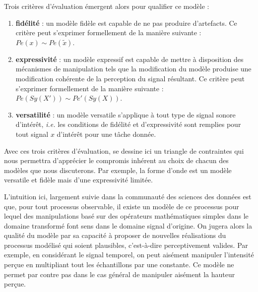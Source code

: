 Trois critères d'évaluation émergent alors pour qualifier ce modèle :
\begin{enumerate}
  \item \textbf{fidélité} : un modèle fidèle est capable de ne pas produire d'artefacts. Ce critère peut s'exprimer formellement de la manière suivante : $Pe(x) \sim Pe(\tilde{x})$.
  \item \textbf{expressivité} : un modèle expressif est capable de mettre à disposition des mécanismes de manipulation tels que la modification du modèle produise une modification cohérente de la perception du signal résultant. Ce critère peut s'exprimer formellement de la manière suivante : $Pe(Sy(X')) \sim Pe'(Sy(X))$.
  \item \textbf{versatilité} : un modèle versatile s'applique à tout type de signal sonore d'intérêt, \textit{i.e.} les conditions de fidélité et d'expressivité sont remplies pour tout signal $x$ d'intérêt pour une tâche donnée.
\end{enumerate}
Avec ces trois critères d'évaluation, se dessine ici un triangle de contraintes qui nous permettra d'apprécier le compromis inhérent au choix  de chacun des modèles que nous discuterons. Par exemple, la forme d'onde est un modèle versatile et fidèle mais d'une expressivité limitée.

L'intuition ici, largement suivie dans la communauté des sciences des données est que, pour tout processus observable, il existe un modèle de ce processus pour lequel des manipulations basé sur des opérateurs mathématiques simples dans le domaine transformé \og font sens \fg dans le domaine \fg signal \og d'origine. On jugera alors la qualité du modèle par sa capacité à proposer de nouvelles réalisations du processus modélisé qui soient plausibles, c'est-à-dire perceptivement valides. Par exemple, en considérant le signal temporel, on peut aisément manipuler l'intensité perçue en multipliant tout les échantillons par une constante. Ce modèle ne permet par contre pas dans le cas général de manipuler aisément la hauteur perçue.

